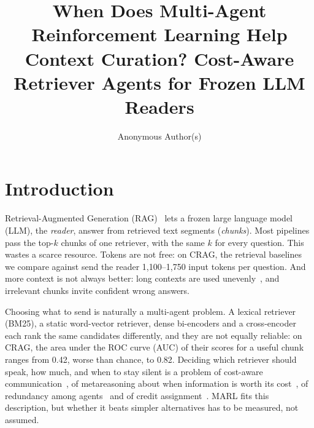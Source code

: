 \documentclass[sigconf,anonymous]{aamas}
\title[When Does MARL Help Context Curation?]{When Does Multi-Agent Reinforcement Learning Help Context Curation? Cost-Aware Retriever Agents for Frozen LLM Readers}
\author{Anonymous Author(s)}
\affiliation{
  \institution{Anonymous Institution}
  \city{Anonymous City}
  \country{Anonymous Country}}
\theoremstyle{plain}
\theoremstyle{definition}
\begin{document}
\maketitle


\section{Introduction}

Retrieval-Augmented Generation (RAG)~\cite{lewis2020rag} lets a frozen large language model (LLM), the \emph{reader}, answer from retrieved text segments (\emph{chunks}). Most pipelines pass the top-$k$ chunks of one retriever, with the same $k$ for every question. This wastes a scarce resource. Tokens are not free: on CRAG, the retrieval baselines we compare against send the reader 1{,}100--1{,}750 input tokens per question. And more context is not always better: long contexts are used unevenly~\cite{liu2024lost}, and irrelevant chunks invite confident wrong answers.

Choosing what to send is naturally a multi-agent problem. A lexical retriever (BM25), a static word-vector retriever, dense bi-encoders and a cross-encoder each rank the same candidates differently, and they are not equally reliable: on CRAG, the area under the ROC curve (AUC) of their scores for a useful chunk ranges from 0.42, worse than chance, to 0.82. Deciding which retriever should speak, how much, and when to stay silent is a problem of cost-aware communication~\cite{lin2026cobe}, of metareasoning about when information is worth its cost~\cite{budd2026thinkfast,russell1991metareasoning}, of redundancy among agents~\cite{zhang2026d3mas} and of credit assignment~\cite{nagpal2025llmmca,foerster2018coma}. MARL fits this description, but whether it beats simpler alternatives has to be measured, not assumed.
\end{document}
